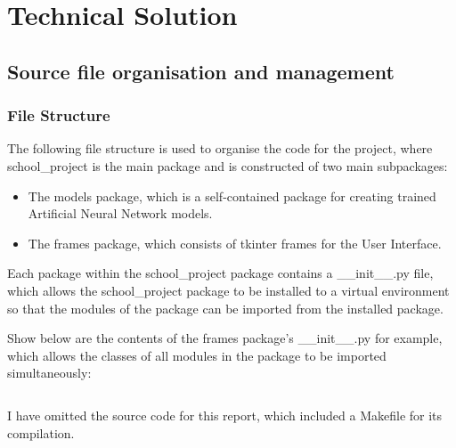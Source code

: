 \documentclass[./project-report/src/latex/project-report.tex]{subfiles}
\begin{document}
\maketitle

\clearpage
\section{Technical Solution}

\subsection{Source file organisation and management }

\subsubsection{File Structure}

The following file structure is used to organise the code for the project, where school\_project is the main package and is constructed of two main subpackages:

\begin{itemize}
    \item The models package, which is a self-contained package for creating trained Artificial Neural Network models.
    \item The frames package, which consists of tkinter frames for the User Interface.
\end{itemize}

\pagebreak

\begin{footnotesize}

\end{footnotesize}

\pagebreak

Each package within the school\_project package contains a \_\_init\_\_.py file, which allows the school\_project package to be installed to a virtual environment 
so that the modules of the package can be imported from the installed package.

Show below are the contents of the frames package's \_\_init\_\_.py for example, which allows the classes of all modules in the package to be imported simultaneously:

\inputminted{python}{./school_project/frames/__init__.py}

I have omitted the source code for this report, which included a Makefile for its compilation.
\end{document}
